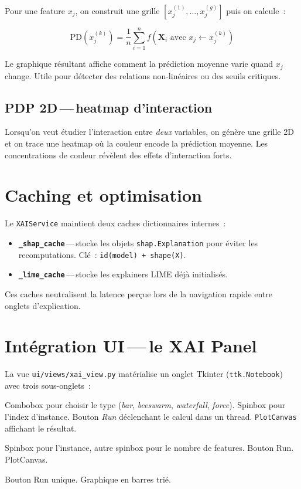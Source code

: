 \documentclass[11pt,a4paper]{report}
\begin{document}
Pour une feature $x_j$, on construit une grille $[x_j^{(1)}, \ldots, x_j^{(g)}]$
puis on calcule~:

\[
\text{PD}(x_j^{(k)}) = \frac{1}{n}\sum_{i=1}^{n} f(\mathbf{X}_i \text{ avec } x_j \gets x_j^{(k)})
\]

Le graphique r\'esultant affiche comment la pr\'ediction moyenne varie
quand $x_j$ change. Utile pour d\'etecter des relations non-lin\'eaires
ou des seuils critiques.

\subsection{PDP 2D\,---\,heatmap d'interaction}

Lorsqu'on veut \'etudier l'interaction entre \textit{deux} variables,
on g\'en\`ere une grille 2D et on trace une heatmap o\`u la couleur
encode la pr\'ediction moyenne. Les concentrations de couleur
r\'ev\`elent des effets d'interaction forts.

\section{Caching et optimisation}

Le \texttt{XAIService} maintient deux caches dictionnaires internes~:

\begin{itemize}
    \item \textbf{\texttt{\_shap\_cache}}\,---\,stocke les objets
        \texttt{shap.Explanation} pour \'eviter les recomputations.
        Cl\'e~: \texttt{id(model) + shape(X)}.
    \item \textbf{\texttt{\_lime\_cache}}\,---\,stocke les explainers
        LIME d\'ej\`a initialis\'es.
\end{itemize}

Ces caches neutralisent la latence per\c{c}ue lors de la navigation
rapide entre onglets d'explication.

\section{Int\'egration UI\,---\,le XAI Panel}

La vue \texttt{ui/views/xai\_view.py} mat\'erialise un onglet
Tkinter (\texttt{ttk.Notebook}) avec trois sous-onglets~:

\begin{description}[font=\sffamily\bfseries\color{accent}]
    \item[SHAP]
        Combobox pour choisir le type (\textit{bar}, \textit{beeswarm},
        \textit{waterfall}, \textit{force}). Spinbox pour
        l'index d'instance. Bouton \textit{Run} d\'eclenchant le calcul
        dans un thread. \texttt{PlotCanvas} affichant le r\'esultat.

    \item[LIME]
        Spinbox pour l'instance, autre spinbox pour le nombre de
        features. Bouton Run. PlotCanvas.

    \item[Feature Importance]
        Bouton Run unique. Graphique en barres tri\'e.
\end{description}
\end{document}
